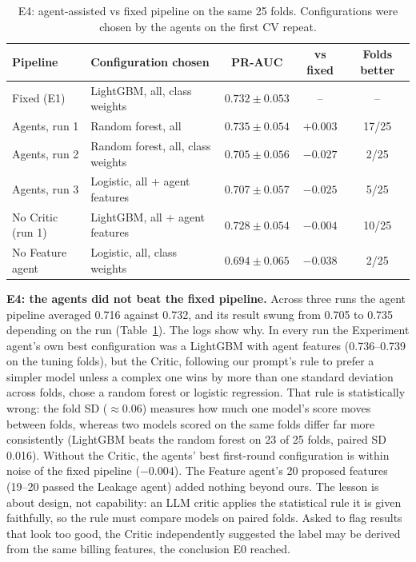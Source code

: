 \documentclass[11pt,a4paper]{article}
\begin{document}
\begin{table}[H]\centering\small
\caption{E4: agent-assisted vs fixed pipeline on the same 25 folds. Configurations were chosen by the agents on the first CV repeat.}\label{tab:e4}
\begin{tabular}{llccc}
\toprule
Pipeline & Configuration chosen & PR-AUC & vs fixed & Folds better \\
\midrule
Fixed (E1) & LightGBM, all, class weights & $0.732\pm0.053$ & -- & -- \\
Agents, run 1 & Random forest, all & $0.735\pm0.054$ & $+0.003$ & 17/25 \\
Agents, run 2 & Random forest, all, class weights & $0.705\pm0.056$ & $-0.027$ & 2/25 \\
Agents, run 3 & Logistic, all + agent features & $0.707\pm0.057$ & $-0.025$ & 5/25 \\
No Critic (run 1) & LightGBM, all + agent features & $0.728\pm0.054$ & $-0.004$ & 10/25 \\
No Feature agent & Logistic, all, class weights & $0.694\pm0.065$ & $-0.038$ & 2/25 \\
\bottomrule
\end{tabular}
\end{table}

\textbf{E4: the agents did not beat the fixed pipeline.} Across three runs the agent pipeline averaged 0.716 against 0.732, and its result swung from 0.705 to 0.735 depending on the run (Table~\ref{tab:e4}). The logs show why. In every run the Experiment agent's own best configuration was a LightGBM with agent features (0.736--0.739 on the tuning folds), but the Critic, following our prompt's rule to prefer a simpler model unless a complex one wins by more than one standard deviation across folds, chose a random forest or logistic regression. That rule is statistically wrong: the fold SD ($\approx0.06$) measures how much one model's score moves between folds, whereas two models scored on the same folds differ far more consistently (LightGBM beats the random forest on 23 of 25 folds, paired SD 0.016). Without the Critic, the agents' best first-round configuration is within noise of the fixed pipeline ($-0.004$). The Feature agent's 20 proposed features (19--20 passed the Leakage agent) added nothing beyond ours. The lesson is about design, not capability: an LLM critic applies the statistical rule it is given faithfully, so the rule must compare models on paired folds. Asked to flag results that look too good, the Critic independently suggested the label may be derived from the same billing features, the conclusion E0 reached.
\end{document}
